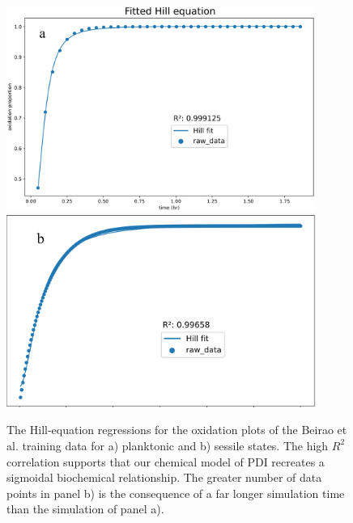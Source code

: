 \begin{figure}
    \centering
    \includegraphics[width = 0.9\textwidth]{images/PDIpy/training/10uM_regression.png}
    \vspace{5mm}
    \midrule
    \vspace{5mm}
    \includegraphics[width = 0.9\textwidth]{images/PDIpy/training/10uM_biofilm_regression.png}
    \caption{
        The Hill-equation regressions for the oxidation plots of the Beirao et al. training data for a) planktonic and b) sessile states. The high $R^2$ correlation supports that our chemical model of PDI recreates a sigmoidal biochemical relationship. The greater number of data points in panel b) is the consequence of a far longer simulation time than the simulation of panel a).
    }
    \label{hill_regression}
\end{figure}


